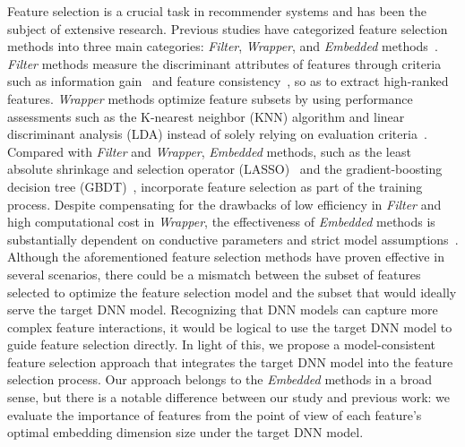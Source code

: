 \documentclass[10pt,journal,compsoc]{IEEEtran}
\begin{document}
{Feature selection is a crucial task in recommender systems and has been the subject of extensive research. Previous studies have categorized feature selection methods into three main categories: \textit{Filter}, \textit{Wrapper}, and \textit{Embedded} methods~\cite{chandrashekar2014survey,wang2020bacterial,zheng2023automl}.}
\textit{Filter} methods measure the discriminant attributes of features through criteria such as information gain~\cite{wang2011igf} and feature consistency~\cite{dash2003consistency}, so as to extract high-ranked features. 
{\textit{Wrapper} methods optimize feature subsets by using performance assessments such as the K-nearest neighbor (KNN) algorithm and linear discriminant analysis (LDA) instead of solely relying on evaluation criteria~\cite{xue2015survey}.}
Compared with \textit{Filter} and \textit{Wrapper}, \textit{Embedded} methods, such as the least absolute shrinkage and selection operator (LASSO)~\cite{liu2015pairwise} and the gradient-boosting decision tree (GBDT)~\cite{friedman2001greedy,he2014practical}, incorporate feature selection as part of the training process. Despite compensating for the drawbacks of low efficiency in \textit{Filter} and high computational cost in \textit{Wrapper}, the effectiveness of \textit{Embedded} methods is substantially dependent on conductive parameters and strict model assumptions~\cite{wang2020bacterial}. 
Although the aforementioned feature selection methods have proven effective in several scenarios,
{there could be a mismatch between the subset of features selected to optimize the feature selection model and the subset that would ideally serve the target DNN model.} 
{Recognizing that DNN models can capture more complex feature interactions, it would be logical to use the target DNN model to guide feature selection directly.} 
{In light of this, we propose a model-consistent feature selection approach that integrates the target DNN model into the feature selection process.} 
Our approach belongs to the \textit{Embedded} methods in a broad sense, but there is a notable difference between our study and previous work: we evaluate the importance of features from the point of view of each feature's optimal embedding dimension size under the target DNN model.
\end{document}
